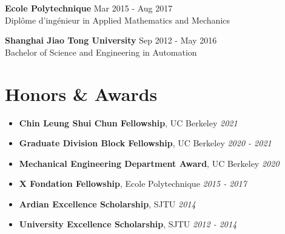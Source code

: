\documentclass[letterpaper,10pt]{article}
\begin{document}
\hspace*{0.5cm} \textbf{Ecole Polytechnique} \hfill Mar 2015 - Aug 2017 \\
\hspace*{0.5cm} Diplôme d'ingénieur in Applied Mathematics and Mechanics
\break

\hspace*{0.5cm} \textbf{Shanghai Jiao Tong University} \hfill Sep 2012 - May 2016 \\
\hspace*{0.5cm} Bachelor of Science and Engineering in Automation

\section{Honors \& Awards}
\begin{itemize}
    \item \textbf{Chin Leung Shui Chun Fellowship}, UC Berkeley \hfill \emph{2021}
    \item \vspace*{-0.25cm} \textbf{Graduate Division Block Fellowship}, UC Berkeley \hfill \emph{2020 - 2021}
    \item \vspace*{-0.25cm} \textbf{Mechanical Engineering Department Award}, UC Berkeley \hfill \emph{2020}
    \item \vspace*{-0.25cm} \textbf{X Fondation Fellowship}, Ecole Polytechnique \hfill \emph{2015 - 2017}
    \item \vspace*{-0.25cm} \textbf{Ardian Excellence Scholarship}, SJTU \hfill \emph{2014}
    \item \vspace*{-0.25cm} \textbf{University Excellence Scholarship}, SJTU \hfill \emph{2012 - 2014}
\end{itemize}



\begin{refsection}[publications]
\nocite{*}
\printbibliography[title = {Publications}]
\end{refsection}
\end{document}
